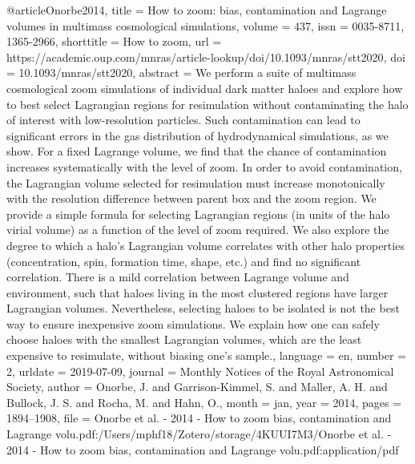 {@article{Onorbe2014,
	title = {How to zoom: bias, contamination and {Lagrange} volumes in multimass cosmological simulations},
	volume = {437},
	issn = {0035-8711, 1365-2966},
	shorttitle = {How to zoom},
	url = {https://academic.oup.com/mnras/article-lookup/doi/10.1093/mnras/stt2020},
	doi = {10.1093/mnras/stt2020},
	abstract = {We perform a suite of multimass cosmological zoom simulations of individual dark matter haloes and explore how to best select Lagrangian regions for resimulation without contaminating the halo of interest with low-resolution particles. Such contamination can lead to signiﬁcant errors in the gas distribution of hydrodynamical simulations, as we show. For a ﬁxed Lagrange volume, we ﬁnd that the chance of contamination increases systematically with the level of zoom. In order to avoid contamination, the Lagrangian volume selected for resimulation must increase monotonically with the resolution difference between parent box and the zoom region. We provide a simple formula for selecting Lagrangian regions (in units of the halo virial volume) as a function of the level of zoom required. We also explore the degree to which a halo’s Lagrangian volume correlates with other halo properties (concentration, spin, formation time, shape, etc.) and ﬁnd no signiﬁcant correlation. There is a mild correlation between Lagrange volume and environment, such that haloes living in the most clustered regions have larger Lagrangian volumes. Nevertheless, selecting haloes to be isolated is not the best way to ensure inexpensive zoom simulations. We explain how one can safely choose haloes with the smallest Lagrangian volumes, which are the least expensive to resimulate, without biasing one’s sample.},
	language = {en},
	number = {2},
	urldate = {2019-07-09},
	journal = {Monthly Notices of the Royal Astronomical Society},
	author = {Onorbe, J. and Garrison-Kimmel, S. and Maller, A. H. and Bullock, J. S. and Rocha, M. and Hahn, O.},
	month = jan,
	year = {2014},
	pages = {1894--1908},
	file = {Onorbe et al. - 2014 - How to zoom bias, contamination and Lagrange volu.pdf:/Users/mphf18/Zotero/storage/4KUUI7M3/Onorbe et al. - 2014 - How to zoom bias, contamination and Lagrange volu.pdf:application/pdf}
}


}
